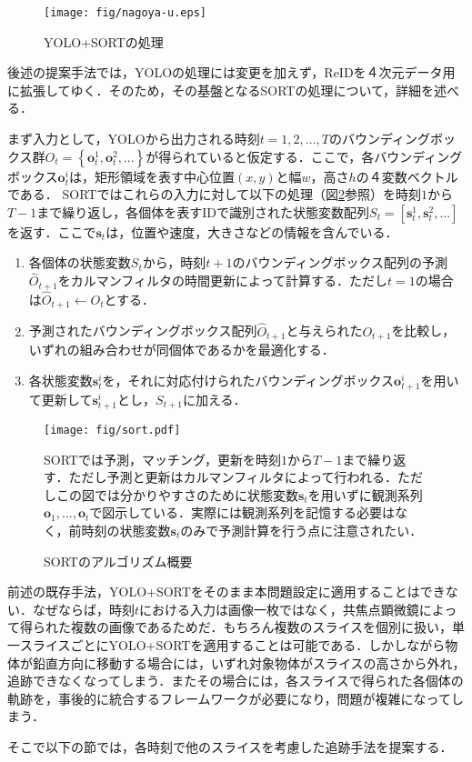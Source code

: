 \begin{figure}[h]
    \centering    
    \texttt{[image: fig/nagoya-u.eps]}
    \caption{YOLO+SORTの処理}
    \label{fig:yolosort}
\end{figure}

後述の提案手法では，YOLOの処理には変更を加えず，ReIDを４次元データ用に拡張してゆく．そのため，その基盤となるSORTの処理について，詳細を述べる．
\par
まず入力として，YOLOから出力される時刻$t=1,2,...,T$のバウンディングボックス群$O_t = \left\{\bm{o}_t^1, \bm{o}_t^2,...\right\}$が得られていると仮定する．ここで，各バウンディングボックス$\bm{o}_t^i$は，矩形領域を表す中心位置$(x,y)$と幅$w$，高さ$h$の４変数ベクトルである． SORTではこれらの入力に対して以下の処理（図\ref{fig:sort}参照）を時刻$1$から$T-1$まで繰り返し，各個体を表すIDで識別された状態変数配列$S_t = \left[\bm{s}_t^1, \bm{s}_t^2,...\right]$を返す．ここで$\bm{s}_t$は，位置や速度，大きさなどの情報を含んでいる．

\begin{enumerate}
    \item 各個体の状態変数$S_t$から，時刻$t+1$のバウンディングボックス配列の予測$\hat{O}_{t+1}$をカルマンフィルタ\cite{adachi2012kalman}の時間更新によって計算する．ただし$t=1$の場合は$\hat{O}_{t+1} \leftarrow O_t$とする．
    \item 予測されたバウンディングボックス配列$\hat{O}_{t+1}$と与えられた$O_{t+1}$を比較し，いずれの組み合わせが同個体であるかを最適化する．
    \item 各状態変数$\bm{s}_t^i$を，それに対応付けられたバウンディングボックス$\bm{o}_{t+1}^i$を用いて更新して$\bm{s}_{t+1}^i$とし，$S_{t+1}$に加える．
\end{enumerate}

\begin{figure}[h]
    \centering    
    \texttt{[image: fig/sort.pdf]}
    \caption{SORTのアルゴリズム概要}
    \small
    SORTでは予測，マッチング，更新を時刻$1$から$T-1$まで繰り返す．ただし予測と更新はカルマンフィルタによって行われる．ただしこの図では分かりやすさのために状態変数$\bm{s}_t$を用いずに観測系列$\bm{o}_1,...,\bm{o}_t$で図示している．実際には観測系列を記憶する必要はなく，前時刻の状態変数$\bm{s}_t$のみで予測計算を行う点に注意されたい．
    \label{fig:sort}
\end{figure}

前述の既存手法，YOLO+SORTをそのまま本問題設定に適用することはできない．なぜならば，時刻$t$における入力は画像一枚ではなく，共焦点顕微鏡によって得られた複数の画像であるためだ．もちろん複数のスライスを個別に扱い，単一スライスごとにYOLO+SORTを適用することは可能である．しかしながら物体が鉛直方向に移動する場合には，いずれ対象物体がスライスの高さから外れ，追跡できなくなってしまう．またその場合には，各スライスで得られた各個体の軌跡を，事後的に統合するフレームワークが必要になり，問題が複雑になってしまう．
\par
そこで以下の節では，各時刻で他のスライスを考慮した追跡手法を提案する．

